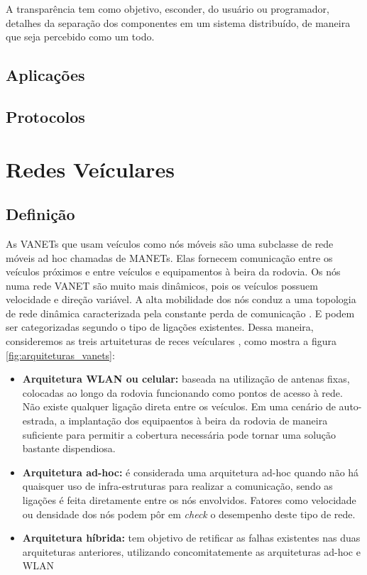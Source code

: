 \documentclass[
	12pt,				%
	oneside,			%
	a4paper,			%
	english,			%
	brazil				%
	]{abntex2ppgsi}
\begin{document}
A transparência tem como objetivo, esconder, do usuário ou programador, detalhes da separação dos componentes em um sistema distribuído, de maneira que seja percebido como um todo.

\section{Aplicações}

\section{Protocolos}


\chapter{Redes Veículares}


\section{Definição}

As VANETs que usam veículos como nós móveis são uma subclasse de rede móveis ad hoc chamadas de MANETs. Elas fornecem comunicação entre os veículos próximos e entre veículos e equipamentos à beira da rodovia. Os nós numa rede VANET são muito mais dinâmicos, pois os veículos possuem velocidade e direção variável. A alta mobilidade dos nós conduz a uma topologia de rede dinâmica caracterizada pela constante perda de comunicação \cite{bubenikova2014security} \cite{jakubiak2008state}. E podem ser categorizadas segundo o tipo de ligações existentes. Dessa maneira, consideremos as treis artuiteturas de reces veículares \cite{luis2009melhoria}, como mostra a figura \ref{fig:arquiteturas_vanets}: 


\begin{itemize}
	\item{\textbf{Arquitetura WLAN ou celular:} baseada na utilização de antenas fixas, colocadas ao longo da rodovia funcionando como pontos de acesso à rede. Não existe qualquer ligação direta entre os veículos. Em uma cenário de auto-estrada, a implantação dos equipaentos à beira da rodovia de maneira suficiente para permitir a cobertura necessária pode tornar uma solução bastante dispendiosa.}	
	\item{\textbf{Arquitetura ad-hoc:} é considerada uma arquitetura ad-hoc quando não há quaisquer uso de infra-estruturas para realizar a comunicação, sendo as ligações é feita diretamente entre os nós envolvidos. Fatores como velocidade ou densidade dos nós podem pôr em \textit{check} o desempenho deste tipo de rede.}	
	\item{\textbf{Arquitetura híbrida: } tem objetivo de retificar as falhas existentes nas duas arquiteturas anteriores, utilizando concomitatemente as arquiteturas ad-hoc e WLAN}	
\end{itemize} 
\end{document}
